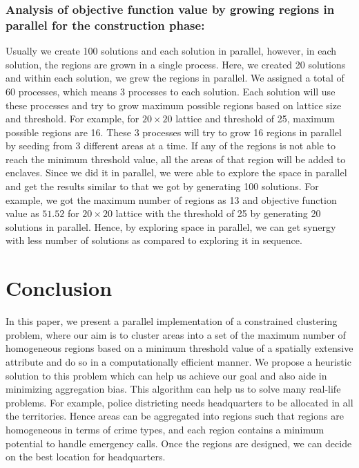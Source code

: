 \documentclass[conference]{IEEEtran}
\begin{document}
\subsubsection*{Analysis of objective function value by growing regions in parallel for the construction phase:}
Usually
we create 100 solutions and each solution in parallel, however, in each
solution, the regions are grown in a single process. Here, we created 20
solutions and within each solution, we grew the regions in parallel. We assigned
a total of 60 processes, which means 3 processes to each solution. Each solution
will use these processes and try to grow maximum possible regions based on
lattice size and threshold. For example, for $20\times 20$ lattice and threshold
of 25, maximum possible regions are 16. These 3 processes will try to grow 16
regions in parallel by seeding from 3 different areas at a time. If any of the
regions is not able to reach the minimum threshold value, all the areas of that
region will be added to enclaves. Since we did it in parallel, we were able to
explore the space in parallel and get the results similar to that we got by
generating 100 solutions. For example, we got the maximum number of regions as
13 and objective function value as $51.52$ for $20\times 20$ lattice with the
threshold of 25 by generating 20 solutions in parallel. Hence, by exploring
space in parallel, we can get synergy with less number of solutions as compared
to exploring it in sequence.

\section{Conclusion}\label{s:conclusion}
In this paper, we present a parallel implementation of a constrained clustering
problem, where our aim is to cluster areas into a set of the maximum number of
homogeneous regions based on a minimum threshold value of a spatially extensive
attribute and do so in a computationally efficient manner. We propose a
heuristic solution to this problem which can help us achieve our goal and also
aide in minimizing aggregation bias. This algorithm can help us to solve many
real-life problems. For example, police districting needs headquarters to be
allocated in all the territories. Hence areas can be aggregated into regions
such that regions are homogeneous in terms of crime types, and each region
contains a minimum potential to handle emergency calls. Once the regions are
designed, we can decide on the best location for headquarters.
\end{document}
